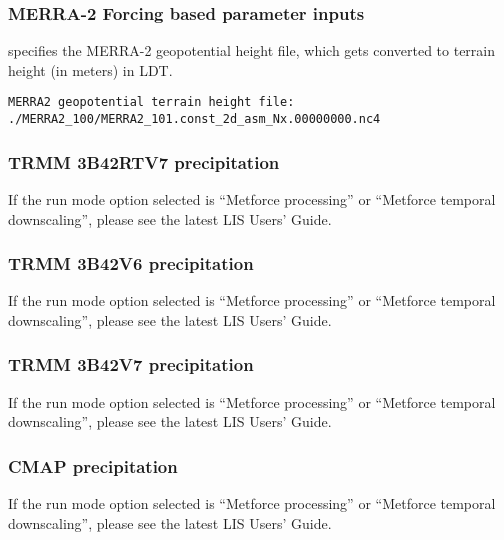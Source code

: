  
 \subsubsection{MERRA-2 Forcing based parameter inputs}

  specifies 
  the MERRA-2 geopotential height file, which gets
  converted to terrain height (in meters) in LDT.

 

 \begin{Verbatim}[frame=single]
MERRA2 geopotential terrain height file: ./MERRA2_100/MERRA2_101.const_2d_asm_Nx.00000000.nc4
 \end{Verbatim}


 
 \subsubsection{TRMM 3B42RTV7 precipitation}

 If the run mode option selected is ``Metforce processing'' or
 ``Metforce temporal downscaling'', please see the latest LIS Users'
 Guide.

 

 
 \subsubsection{TRMM 3B42V6 precipitation} 

 If the run mode option selected is ``Metforce processing'' or
 ``Metforce temporal downscaling'', please see the latest LIS Users'
 Guide.

 

 
 \subsubsection{TRMM 3B42V7 precipitation} 

 If the run mode option selected is ``Metforce processing'' or
 ``Metforce temporal downscaling'', please see the latest LIS Users'
 Guide.

 

 
 \subsubsection{CMAP precipitation}

 If the run mode option selected is ``Metforce processing'' or
 ``Metforce temporal downscaling'', please see the latest LIS Users'
 Guide.

